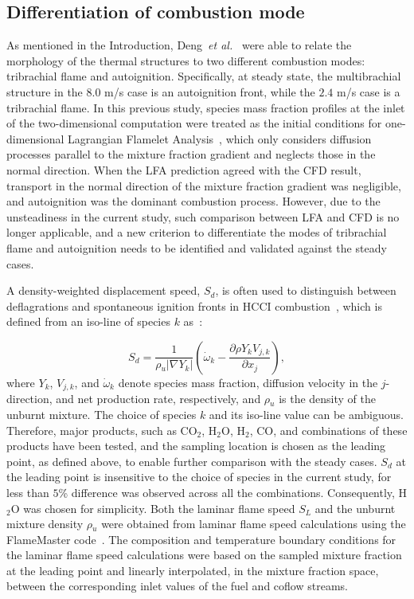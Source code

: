 \documentclass[review,3p,times]{elsarticle}
\def\pp#1#2{\frac{\partial #1}{\partial #2}}
\begin{document}
\subsection{Differentiation of combustion mode}

As mentioned in the Introduction, Deng~\emph {et al.}~\cite{deng15b} were able to relate the morphology of the thermal structures to two different combustion modes: tribrachial flame and autoignition.  Specifically, at steady state, the multibrachial structure in the $8.0$ m/s case is an autoignition front, while the $2.4$ m/s case is a tribrachial flame.  In this previous study, species mass fraction profiles at the inlet of the two-dimensional computation were treated as the initial conditions for one-dimensional Lagrangian Flamelet Analysis~\cite{pitsch98a}, which only considers diffusion processes parallel to the mixture fraction gradient and neglects those in the normal direction.  When the LFA prediction agreed with the CFD result, transport in the normal direction of the mixture fraction gradient was negligible, and autoignition was the dominant combustion process.  However, due to the unsteadiness in the current study, such comparison between LFA and CFD is no longer applicable, and a new criterion to differentiate the modes of tribrachial flame and autoignition needs to be identified and validated against the steady cases.

A density-weighted displacement speed, $S_d$, is often used to distinguish between deflagrations and spontaneous ignition fronts in HCCI combustion~\cite{yoo13}, which is defined from an iso-line of species $k$ as~\cite{ruetsch95,im99}:

\begin{equation} \label{eq:sd}
S_d = \frac{1}{\rho{_u} |\nabla Y_k|} \left(\dot{\omega}{_k} - \pp{\rho Y_k V_{j,k}}{x_j} \right),
\end{equation}
where $Y_k$, $V_{j,k}$, and $\dot{\omega}{_k}$ denote species mass fraction, diffusion velocity in the $j$-direction, and net production rate, respectively, and $\rho {_u}$ is the density of the unburnt mixture.  The choice of species $k$ and its iso-line value can be ambiguous.  Therefore, major products, such as CO$_2$, H$_2$O, H$_2$, CO, and combinations of these products have been tested, and the sampling location is chosen as the leading point, as defined above, to enable further comparison with the steady cases.  $S_d$ at the leading point is insensitive to the choice of species in the current study, for less than $5$\% difference was observed across all the combinations.  Consequently, H$_2$O was chosen for simplicity.  Both the laminar flame speed $S_L$ and the unburnt mixture density $\rho {_u}$ were obtained from laminar flame speed calculations using the FlameMaster code~\cite{flamemaster}.  The composition and temperature boundary conditions for the laminar flame speed calculations were based on the sampled mixture fraction at the leading point and linearly interpolated, in the mixture fraction space, between the corresponding inlet values of the fuel and coflow streams.  
\end{document}
